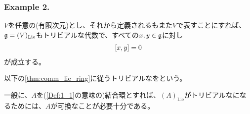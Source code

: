 \documentclass[../main]{subfiles}
\begin{document}
\subsubsection*{Example 2.}\label{ex:2}
\begin{remark}
  $V$を任意の(有限次元)とし、それから定義されるもまた$V$で表すことにすれば、$\mathfrak{g}=(V)_\mathrm{Lie}$もトリビアルな代数で、すべての$x,y\in\mathfrak{g}$に対し
  \begin{align*}
    \comm{x}{y}=0
  \end{align*}が成立する。
\end{remark}
\begin{named}
  以下の\cref{thm:comm_lie_ring}に従うトリビアルな{}をという。
\end{named}
\begin{theorem}[可換なリー環]\label{thm:comm_lie_ring}
  一般に、$A$を(\cref{Def:1_1}の意味の)結合環とすれば、$(A)_\mathrm{Lie}$がトリビアルな{}になるためには、$A$が可換なことが必要十分である。
\end{theorem}
\end{document}
